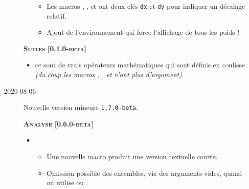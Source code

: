 \documentclass[12pt,a4paper]{book}
\begin{document}
\begin{description}
\begin{itemize}[itemsep=.5em]
\begin{itemize}[itemsep=.5em]
            \item Les macros , , 
                   et 
                  ont deux clés \verb#dx# et \verb#dy# pour indiquer un décalage relatif.
            
            \item Ajout de l'environnement  qui force l'affichage de tous les poids !
        \end{itemize}
    \end{itemize}
    
    
    \separation
    
    
    
    
    \begin{center}
        \textbf{\textsc{Suites [0.1.0-beta]}}
    \end{center}
    
    \begin{itemize}[itemsep=.5em]
        \item {}
              ce sont de vrais opérateurs mathématiques qui sont définis en coulisse \emph{(du coup les macros , ,  et  n'ont plus d'argument)}.   
    \end{itemize}
    
    
    \separation


    \medskip
    \item[2020-08-06] Nouvelle version mineure \verb+1.7.0-beta+.
    
    
    
    
    \begin{center}
        \textbf{\textsc{Analyse [0.6.0-beta]}}
    \end{center}
    
    \begin{itemize}[itemsep=.5em]
        \item {}
        \begin{itemize}[itemsep=.5em]
            \item Une nouvelle macro  produit une version textuelle courte.
    
            \item Omission possible des ensembles, via des arguments vides, quand on utilise  ou .
        \end{itemize}
    

\end{itemize}
\end{description}
\end{document}
